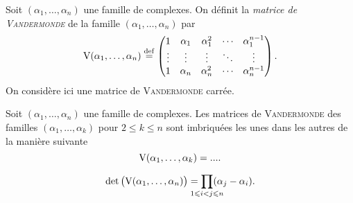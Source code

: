 \begin{defi}
    Soit $(\alpha_1, \dots, \alpha_n)$ une famille de complexes. On définit la \emph{matrice de \textsc{Vandermonde}} de la famille $(\alpha_1, \dots, \alpha_n)$ par
    $$\mathrm{V}(\alpha_1, \dots, \alpha_n) \overset{\mathrm{\tiny def}}{=} \begin{pmatrix}
    1 & \alpha_1 & \alpha_1^2 & \cdots & \alpha_1^{n-1} \\
    \vdots & \vdots & \vdots & \ddots & \vdots \\
    1 & \alpha_n & \alpha_n^2 & \cdots & \alpha_n^{n-1}
    \end{pmatrix}.$$
    On considère ici une matrice de \textsc{Vandermonde} carrée.
\end{defi}

\newcommand{\vandk}{
\left(\begin{gathered}
    [every node/.style={anchor=south west}]
        \node[mitikzpicturenimum width=2cm,minimum height=1.5cm] at (-0.16,0.625) {$\Vandermonde(\alpha_1, \dots, \alpha_{k-1})$};
        \node[minimum width=0.5cm,minimum height=0.5cm] at (0,0.05) {$1$};
        \node[minimum width=0.5cm,minimum height=0.5cm] at (0.4, 0) {$\alpha_{k}$};
        \node[minimum width=0.5cm,minimum height=0.5cm] at (0.95,0) {$\cdots$};
        \node[minimum width=0.5cm,minimum height=0.5cm] at (1.5,0) {$\alpha_{k}^{k-2}$};
        \node[minimum width=1cm,minimum height=0.5cm] at (2.5,0) {$\alpha_{k}^{k-1}$};
        \node[minimum width=1cm,minimum height=1cm] at (2.5,0.4) {$\alpha_{k-1}^{k-1}$};
        \node[minimum width=1cm,minimum height=1cm] at (2.5,1) {$\vdots$};
        \node[minimum width=1cm,minimum height=1cm] at (2.5,1.4) {$\alpha_1^{k-1}$};
        \draw (0,0.6) -- (2.5,0.6);
        \draw (2.5,0.6) -- (2.5,2.225);
        \draw[dashed] (2.5,0.6) -- (3.5,0.6);
        \draw[dashed] (2.5,0.6) -- (2.5,0);
    \endtikzpicture
    \end{gathered}\right)
}

\begin{remarque}
    Soit $(\alpha_1, \dots, \alpha_n)$ une famille de complexes. Les matrices de \textsc{Vandermonde} des familles $(\alpha_1, \dots, \alpha_k)$ pour $2 \leqslant k \leqslant n$ sont imbriquées les unes dans les autres de la manière suivante
    $$\mathrm{V}(\alpha_1, \dots, \alpha_k) = ....$$
\end{remarque}

\begin{prop}
    $$\det \big( \Vandermonde(\alpha_1, \dots, \alpha_n) \big) = \smashoperator{\prod_{1\leqslant i < j \leqslant n}}(\alpha_j - \alpha_i).$$
\end{prop}

